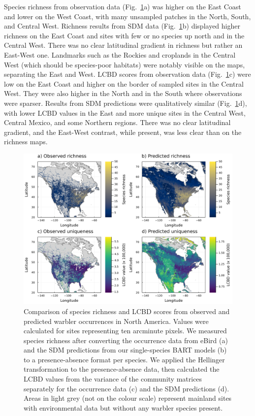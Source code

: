 \documentclass[11pt]{article}
\makeatletter
\def\maxwidth{\ifdim\Gin@nat@width>\linewidth\linewidth
\else\Gin@nat@width\fi}
\let\Oldincludegraphics\includegraphics
\renewcommand{\includegraphics}[1]{\Oldincludegraphics[width=\maxwidth]{#1}}
\makeatother
\begin{document}
Species richness from observation data (Fig.~\ref{fig:maps}a) was higher
on the East Coast and lower on the West Coast, with many unsampled
patches in the North, South, and Central West. Richness results from SDM
data (Fig.~\ref{fig:maps}b) displayed higher richness on the East Coast
and sites with few or no species up north and in the Central West. There
was no clear latitudinal gradient in richness but rather an East-West
one. Landmarks such as the Rockies and croplands in the Central West
(which should be species-poor habitats) were notably visible on the
maps, separating the East and West. LCBD scores from observation data
(Fig.~\ref{fig:maps}c) were low on the East Coast and higher on the
border of sampled sites in the Central West. They were also higher in
the North and in the South where observations were sparser. Results from
SDM predictions were qualitatively similar (Fig.~\ref{fig:maps}d), with
lower LCBD values in the East and more unique sites in the Central West,
Central Mexico, and some Northern regions. There was no clear
latitudinal gradient, and the East-West contrast, while present, was
less clear than on the richness maps.

\begin{figure}
\hypertarget{fig:maps}{%
\centering
\includegraphics{figures/comparison-combined.png}
\caption{Comparison of species richness and LCBD scores from observed
and predicted warbler occurrences in North America. Values were
calculated for sites representing ten arcminute pixels. We measured
species richness after converting the occurrence data from eBird (a) and
the SDM predictions from our single-species BART models (b) to a
presence-absence format per species. We applied the Hellinger
transformation to the presence-absence data, then calculated the LCBD
values from the variance of the community matrices separately for the
occurrence data (c) and the SDM predictions (d). Areas in light grey
(not on the colour scale) represent mainland sites with environmental
data but without any warbler species present.}\label{fig:maps}
}
\end{figure}
\end{document}
